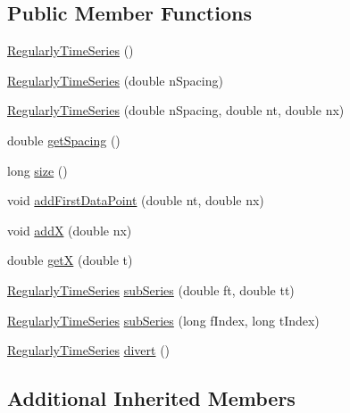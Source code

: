 \subsection*{Public Member Functions}
\begin{DoxyCompactItemize}
\item 
\hyperlink{classtimeseries_1_1_regularly_time_series_ada900123604958ddae734c40bab636e7}{Regularly\+Time\+Series} ()
\item 
\hyperlink{classtimeseries_1_1_regularly_time_series_a278db93dcce4c470b666d9b5758c838a}{Regularly\+Time\+Series} (double n\+Spacing)
\item 
\hyperlink{classtimeseries_1_1_regularly_time_series_ab02cf758028f6ee2f54cd1b00895348a}{Regularly\+Time\+Series} (double n\+Spacing, double nt, double nx)
\item 
double \hyperlink{classtimeseries_1_1_regularly_time_series_a2cea069690717b0f52775619c5e2aa8e}{get\+Spacing} ()
\item 
long \hyperlink{classtimeseries_1_1_regularly_time_series_a635ace3b88199750c47882d546255515}{size} ()
\item 
void \hyperlink{classtimeseries_1_1_regularly_time_series_a0735eaa4a72c73ea82c65c9691bd2c11}{add\+First\+Data\+Point} (double nt, double nx)
\item 
void \hyperlink{classtimeseries_1_1_regularly_time_series_a81e7fa5652d91d707d99005c8ffef413}{add\+X} (double nx)
\item 
double \hyperlink{classtimeseries_1_1_regularly_time_series_a42fa72dae696838e7ec8842c037bfe6f}{get\+X} (double t)
\item 
\hyperlink{classtimeseries_1_1_regularly_time_series}{Regularly\+Time\+Series} \hyperlink{classtimeseries_1_1_regularly_time_series_a46c28fb21d2fe1adcd9dbf2c3c1f72d2}{sub\+Series} (double ft, double tt)
\item 
\hyperlink{classtimeseries_1_1_regularly_time_series}{Regularly\+Time\+Series} \hyperlink{classtimeseries_1_1_regularly_time_series_a461fceebc34325112ac6f680ccbb78d3}{sub\+Series} (long f\+Index, long t\+Index)
\item 
\hyperlink{classtimeseries_1_1_regularly_time_series}{Regularly\+Time\+Series} \hyperlink{classtimeseries_1_1_regularly_time_series_a4c9c8f659f669b987fa62d95c8820c34}{divert} ()
\end{DoxyCompactItemize}
\subsection*{Additional Inherited Members}


